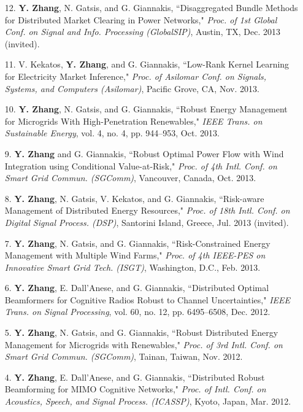 \documentclass[margin,line]{res}
\begin{document}
\begin{resume}
\begin{enumerate}
\item[12.]	\textbf{Y. Zhang}, N. Gatsis, and G. Giannakis,
``Disaggregated Bundle Methods for Distributed Market Clearing in Power Networks,"
\emph{Proc. of 1st Global Conf. on Signal and Info. Processing (GlobalSIP)}, Austin, TX, Dec. 2013 (invited).

\item[11.]	V. Kekatos, \textbf{Y. Zhang}, and G. Giannakis,
``Low-Rank Kernel Learning for Electricity Market Inference,"
\emph{Proc. of Asilomar Conf. on Signals, Systems, and Computers (Asilomar)}, Pacific Grove, CA, Nov. 2013.

\item[10.]	\textbf{Y. Zhang}, N. Gatsis, and G. Giannakis,
``Robust Energy Management for Microgrids With High-Penetration Renewables,"
\emph{IEEE Trans. on Sustainable Energy}, vol. 4, no. 4, pp. 944--953, Oct. 2013.

\item[9.]	\textbf{Y. Zhang} and G. Giannakis,
``Robust Optimal Power Flow with Wind Integration using Conditional Value-at-Risk,"
\emph{Proc. of 4th Intl. Conf. on Smart Grid Commun. (SGComm)}, Vancouver, Canada, Oct. 2013.

\item[8.]	\textbf{Y. Zhang}, N. Gatsis, V. Kekatos, and G. Giannakis,
``Risk-aware Management of Distributed Energy Resources,"
\emph{Proc. of 18th Intl. Conf. on Digital Signal Process. (DSP)}, Santorini Island, Greece, Jul. 2013 (invited).

\item[7.] \textbf{Y. Zhang}, N. Gatsis, and G. Giannakis,
``Risk-Constrained Energy Management with Multiple Wind Farms,"
\emph{Proc. of 4th IEEE-PES on Innovative Smart Grid Tech. (ISGT)}, Washington, D.C., Feb. 2013.

\item[6.]	\textbf{Y. Zhang}, E. Dall'Anese, and G. Giannakis,
``Distributed Optimal Beamformers for Cognitive Radios Robust to Channel Uncertainties,"
\emph{IEEE Trans. on Signal Processing}, vol. 60, no. 12, pp. 6495--6508, Dec. 2012.

\item[5.] \textbf{Y. Zhang}, N. Gatsis, and G. Giannakis,
``Robust Distributed Energy Management for Microgrids with Renewables,"
\emph{Proc. of 3rd Intl. Conf. on Smart Grid Commun. (SGComm)}, Tainan, Taiwan, Nov. 2012.

\item[4.] \textbf{Y. Zhang}, E. Dall'Anese, and G. Giannakis,
``Distributed Robust Beamforming for MIMO Cognitive Networks,"
\emph{Proc. of Intl. Conf. on Acoustics, Speech, and Signal Process. (ICASSP)}, Kyoto, Japan, Mar. 2012.


\end{enumerate}
\end{resume}
\end{document}
